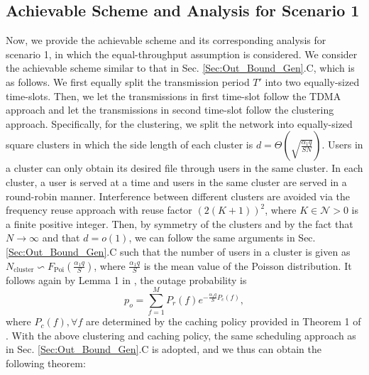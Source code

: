 \documentclass[journal,draftclsnofoot,onecolumn,12pt,twoside]{IEEEtran}
\begin{document}
\subsection{Achievable Scheme and Analysis for Scenario 1}

Now, we provide the achievable scheme and its corresponding analysis for scenario 1, in which the equal-throughput assumption is considered. We consider the achievable scheme similar to that in Sec. \ref{Sec:Out_Bound_Gen}.C, which is as follows. We first equally split the transmission period $T'$ into two equally-sized time-slots. Then, we let the transmissions in first time-slot follow the TDMA approach and let the transmissions in second time-slot follow the clustering approach. Specifically, for the clustering, we split the network into equally-sized square clusters in which the side length of each cluster is $d=\Theta\left(\sqrt{\frac{\alpha_1 q}{SN}}\right)$. Users in a cluster can only obtain its desired file through users in the same cluster. In each cluster, a user is served at a time and users in the same cluster are served in a round-robin manner. Interference between different clusters are avoided via the frequency reuse approach with reuse factor $(2(K+1))^2$, where $K\in\mathcal{N}>0$ is a finite positive integer. Then, by symmetry of the clusters and by the fact that $N\to\infty$ and that $d=o(1)$, we can follow the same arguments in Sec. \ref{Sec:Out_Bound_Gen}.C such that the number of users in a cluster is given as $N_{\text{cluster}}\backsim F_{\text{Poi}}\left(\frac{\alpha_1 q}{S}\right)$, where $\frac{\alpha_1 q}{S}$ is the mean value of the Poisson distribution. It follows again by Lemma 1 in \cite{lee2020optimal}, the outage probability is 
\begin{equation}
p_o=\sum_{f=1}^M P_r(f) e^{-\frac{\alpha_1 q}{S}P_c(f)},
\end{equation}
where $P_c(f),\forall f$ are determined by the caching policy provided in Theorem 1 of \cite{lee2020optimal}. With the above clustering and caching policy, the same scheduling approach as in Sec. \ref{Sec:Out_Bound_Gen}.C is adopted, and we thus can obtain the following theorem:
\end{document}
